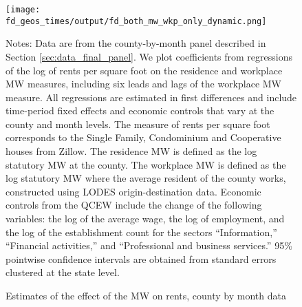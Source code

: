 
\begin{figure}[h!]
    \centering
    \caption{Estimates of the effect of the MW on rents, county by month data}
    \label{fig:dynamic_county_month}

	\texttt{[image: fd\_geos\_times/output/fd\_both\_mw\_wkp\_only\_dynamic.png]}

    \begin{minipage}{.95\textwidth} \footnotesize
        \vspace{3mm}
        Notes:
        Data are from the county-by-month panel described in Section 
        \ref{sec:data_final_panel}.
        We plot coefficients from regressions of the log of rents per
        square foot on the residence and workplace MW measures, including 
        six leads and lags of the workplace MW measure.
        All regressions are estimated in first differences and include 
        time-period fixed effects and economic controls that vary at the 
        county and month levels.
        The measure of rents per square foot corresponds to the Single Family, 
        Condominium and Cooperative houses from Zillow.
        The residence MW is defined as the log statutory MW at the county.
        The workplace MW is defined as the log statutory MW where the average 
        resident of the county works, constructed using LODES 
        origin-destination data.
        Economic controls from the QCEW include the change of the following 
        variables: the log of the average wage, the log of employment, and the 
        log of the establishment count for the sectors ``Information,'' 
        ``Financial activities,'' and ``Professional and business services.''
        95\% pointwise confidence intervals are obtained from standard errors 
        clustered at the state level.
    \end{minipage}
\end{figure}
